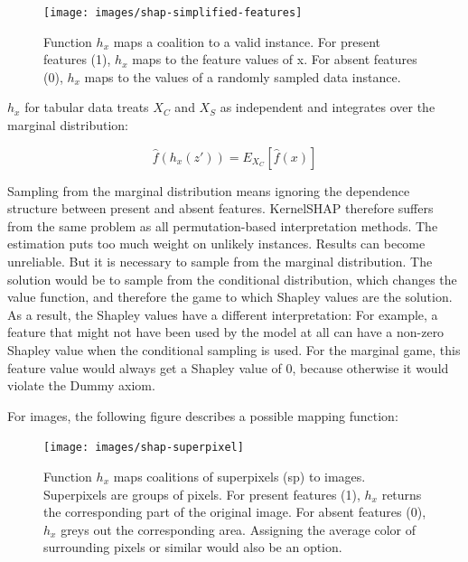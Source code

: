 \documentclass[
  11pt,
]{scrbook}
\begin{document}
\begin{figure}

{\centering \texttt{[image: images/shap-simplified-features]} 

}

\caption{Function $h_x$ maps a coalition to a valid instance. For present features (1), $h_x$ maps to the feature values of x. For absent features (0), $h_x$ maps to the values of a randomly sampled data instance.}\label{fig:shap-simplified-feature}
\end{figure}

\(h_x\) for tabular data treats \(X_C\) and \(X_S\) as independent and integrates over the marginal distribution:

\[\hat{f}(h_x(z'))=E_{X_C}[\hat{f}(x)]\]

Sampling from the marginal distribution means ignoring the dependence structure between present and absent features.
KernelSHAP therefore suffers from the same problem as all permutation-based interpretation methods.
The estimation puts too much weight on unlikely instances.
Results can become unreliable.
But it is necessary to sample from the marginal distribution.
The solution would be to sample from the conditional distribution, which changes the value function, and therefore the game to which Shapley values are the solution.
As a result, the Shapley values have a different interpretation:
For example, a feature that might not have been used by the model at all can have a non-zero Shapley value when the conditional sampling is used.
For the marginal game, this feature value would always get a Shapley value of 0, because otherwise it would violate the Dummy axiom.

For images, the following figure describes a possible mapping function:

\begin{figure}

{\centering \texttt{[image: images/shap-superpixel]} 

}

\caption{Function $h_x$ maps coalitions of superpixels (sp) to images. Superpixels are groups of pixels. For present features (1), $h_x$ returns the corresponding part of the original image. For absent features (0), $h_x$ greys out the corresponding area. Assigning the average color of surrounding pixels or similar would also be an option.}\label{fig:unnamed-chunk-43}
\end{figure}
\end{document}
